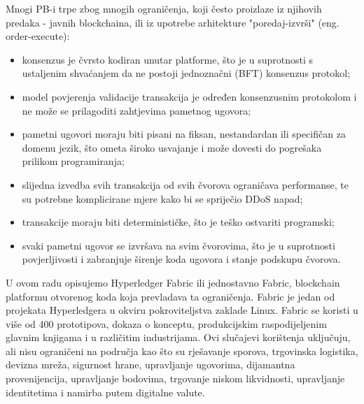 \documentclass[times, utf8, diplomski]{fer}
\begin{document}
Mnogi PB-i trpe zbog mnogih ograničenja, koji često proizlaze iz njihovih predaka - javnih blockchaina, ili iz upotrebe arhitekture "poredaj-izvrši" (eng. order-execute):

\begin{itemize}

\item konsenzus je čvrsto kodiran unutar platforme, što je u suprotnosti s ustaljenim shvaćanjem da ne postoji jednoznačni (BFT) konsenzus protokol;

\item model povjerenja validacije transakcija je određen konsenzusnim protokolom i ne može se prilagoditi zahtjevima pametnog ugovora;

\item pametni ugovori moraju biti pisani na fiksan, nestandardan ili specifičan za domenu jezik, što ometa široko usvajanje i može dovesti do pogrešaka prilikom programiranja;

\item slijedna izvedba svih transakcija od svih čvorova ograničava performanse, te su potrebne komplicirane mjere kako bi se spriječio DDoS napad;

\item transakcije moraju biti determinističke, što je teško ostvariti programski;

\item svaki pametni ugovor se izvršava na svim čvorovima, što je u suprotnosti povjerljivosti i zabranjuje širenje koda ugovora i stanje podskupu čvorova. \cite{Fabric}

\end{itemize}

U ovom radu opisujemo Hyperledger Fabric ili jednostavno Fabric, blockchain
platformu otvorenog koda koja prevladava ta ograničenja. Fabric je jedan od projekata Hyperledgera u okviru pokroviteljstva zaklade Linux. Fabric se koristi u više od 400 prototipova, dokaza o konceptu, produkcijskim raspodijeljenim glavnim knjigama i u različitim industrijama. Ovi slučajevi korištenja uključuju, ali nisu ograničeni na područja kao što su rješavanje sporova, trgovinska logistika, devizna mreža, sigurnost hrane, upravljanje ugovorima, dijamantna provenijencija, upravljanje bodovima, trgovanje niskom likvidnosti, upravljanje identitetima i namirba putem digitalne valute.
\end{document}
